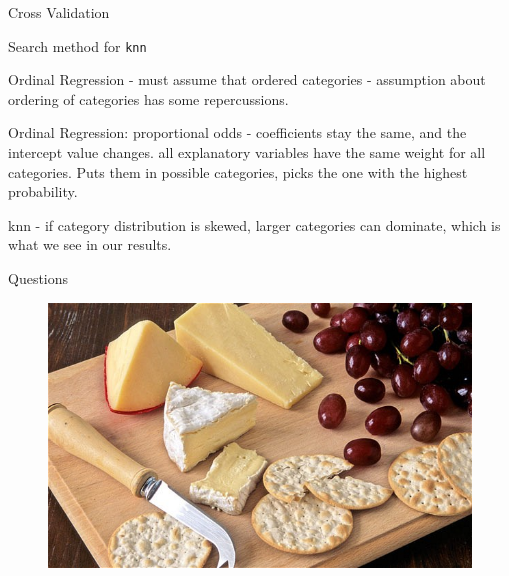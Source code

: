 \documentclass{beamer}
\begin{document}
\begin{frame}{}
Cross Validation

Search method for \texttt{knn}

Ordinal Regression - must assume that 
ordered categories - assumption about ordering of categories has some repercussions.

Ordinal Regression: proportional odds - coefficients stay the same, and the intercept value changes. all explanatory variables have the same weight for all categories. Puts them in possible categories, picks the one with the highest probability. 

knn - if category distribution is skewed, larger categories can dominate, which is what we see in our results.

\end{frame}

\begin{frame}{Questions}
	\begin{figure}
		\centering
		\includegraphics[width=\textwidth]{../images/cheese.jpg}
	\end{figure}
\end{frame}
\end{document}

